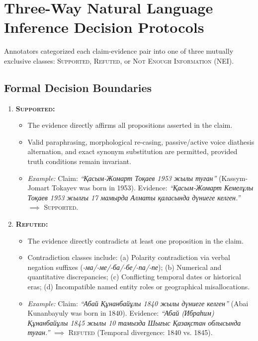 \section{Three-Way Natural Language Inference Decision Protocols}
\label{sec:app_fever_decision_protocols}

Annotators categorized each claim-evidence pair into one of three mutually exclusive classes: \textsc{Supported}, \textsc{Refuted}, or \textsc{Not Enough Information} (NEI).

\subsection{Formal Decision Boundaries}
\begin{enumerate}
    \item \textbf{\textsc{Supported}:}
    \begin{itemize}
        \item The evidence directly affirms all propositions asserted in the claim.
        \item Valid paraphrasing, morphological re-casing, passive/active voice diathesis alternation, and exact synonym substitution are permitted, provided truth conditions remain invariant.
        \item \textit{Example:} Claim: \textit{``Қасым-Жомарт Тоқаев 1953 жылы туған''} (Kassym-Jomart Tokayev was born in 1953). Evidence: \textit{``Қасым-Жомарт Кемелұлы Тоқаев 1953 жылғы 17 мамырда Алматы қаласында дүниеге келген.''} $\implies$ \textsc{Supported}.
    \end{itemize}

    \item \textbf{\textsc{Refuted}:}
    \begin{itemize}
        \item The evidence directly contradicts at least one proposition in the claim.
        \item Contradiction classes include: (a) Polarity contradiction via verbal negation suffixes (\textit{-ма/-ме/-ба/-бе/-па/-пе}); (b) Numerical and quantitative discrepancies; (c) Conflicting temporal dates or historical eras; (d) Incompatible named entity roles or geographical misallocations.
        \item \textit{Example:} Claim: \textit{``Абай Құнанбайұлы 1840 жылы дүниеге келген''} (Abai Kunanbayuly was born in 1840). Evidence: \textit{``Абай (Ибраһим) Құнанбайұлы 1845 жылы 10 тамызда Шығыс Қазақстан облысында туған.''} $\implies$ \textsc{Refuted} (Temporal divergence: 1840 vs. 1845).
    \end{itemize}


\end{enumerate}
